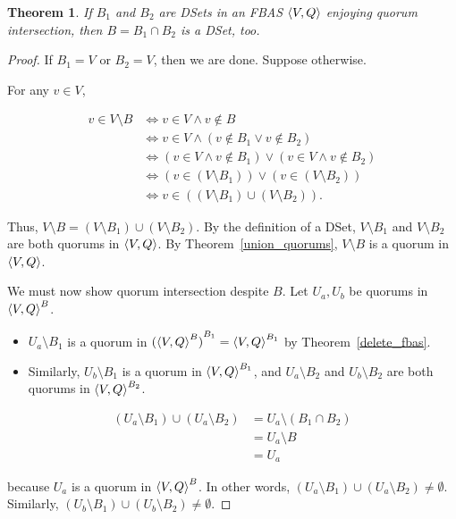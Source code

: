\documentclass[12pt, psamsfonts]{amsart}
\newtheorem{thm}{Theorem}[section]
\theoremstyle{definition}
\theoremstyle{remark}
\numberwithin{equation}{section}
\begin{document}
\begin{thm}\label{intersection_dset}
    If $B_1$ and $B_2$ are DSets in an FBAS $\ev{V, Q}$ enjoying quorum intersection, then $B = B_1 \cap B_2$ is a DSet, too.
\end{thm}

\begin{proof}
	If $B_1 = V$ or $B_2 = V$, then we are done.
	Suppose otherwise.

	For any $v \in V$,

	\begin{align*}
	  v \in V \setminus B
		&\iff v \in V \land v \notin B \\
		&\iff v \in V \land (v \notin B_1 \lor v \notin B_2) \\
		&\iff (v \in V \land v \notin B_1) \lor (v \in V \land v \notin B_2) \\
		&\iff (v \in (V \setminus B_1)) \lor (v \in (V \setminus B_2)) \\
		&\iff v \in ((V \setminus B_1) \cup (V \setminus B_2)).
	\end{align*}

	Thus, $V \setminus B = (V \setminus B_1) \cup (V \setminus B_2)$.
	By the definition of a DSet, $V \setminus B_1$ and $V \setminus B_2$ are both quorums in $\ev{V, Q}$.
	By Theorem~\ref{union_quorums}, $V \setminus B$ is a quorum in $\ev{V, Q}$.

	We must now show quorum intersection despite $B$.
	Let $U_a, U_b$ be quorums in $\ev{V, Q}^B$.

	\begin{itemize}
		\item
            $U_a \setminus B_1$ is a quorum in ${(\ev{V, Q}^B)}^{B_1} = \ev{V, Q}^{B_1}$ by Theorem~\ref{delete_fbas}.
		\item
			Similarly, $U_b \setminus B_1$ is a quorum in $\ev{V, Q}^{B_1}$, and $U_a \setminus B_2$ and $U_b \setminus B_2$ are both quorums in $\ev{V, Q}^{B_2}$.
	\end{itemize}

	\begin{align*}
	  (U_a \setminus B_1) \cup (U_a \setminus B_2)
		&= U_a \setminus (B_1 \cap B_2) \\
		&= U_a \setminus B \\
		&= U_a
	\end{align*}

	because $U_a$ is a quorum in $\ev{V, Q}^B$.
	In other words, $(U_a \setminus B_1) \cup (U_a \setminus B_2) \ne \emptyset$.
	Similarly, $(U_b \setminus B_1) \cup (U_b \setminus B_2) \ne \emptyset$.


\end{proof}
\end{document}
